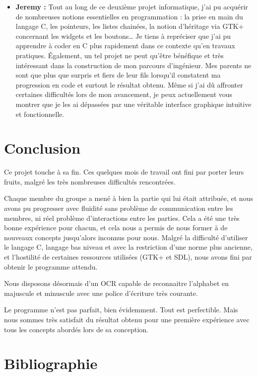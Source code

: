 \documentclass[12pt]{report}
\begin{document}
\begin{itemize}
	\item \textbf{Jeremy :} Tout au long de ce deuxième projet informatique, j’ai pu acquérir de nombreuses notions essentielles en programmation : la prise en main du langage C, les pointeurs, les listes chainées, la notion d’héritage via GTK+ concernant les widgets et les boutons… Je tiens à repréciser que j’ai pu apprendre à coder en C plus rapidement dans ce contexte qu’en travaux pratiques. Également, un tel projet ne peut qu’être bénéfique et très intéressant dans la construction de mon parcours d’ingénieur. Mes parents ne sont que plus que surpris et fiers de leur fils lorsqu’il constatent ma progression en code et surtout le résultat obtenu. Même si j’ai dû affronter certaines difficultés lors de mon avancement, je peux actuellement vous montrer que je les ai dépassées par une véritable interface graphique intuitive et fonctionnelle.
\end{itemize}

\chapter{Conclusion}

Ce projet touche à sa fin. Ces quelques mois de travail ont fini par porter leurs fruits, malgré les très nombreuses difficultés rencontrées.

Chaque membre du groupe a mené à bien la partie qui lui était attribuée, et nous avons pu progresser avec fluidité sans problème de communication entre les membres, ni réel problème d'interactions entre les parties. Cela a été une très bonne expérience pour chacun, et cela nous a permis de nous former à de nouveaux concepts jusqu'alors inconnus pour nous. Malgré la difficulté d'utiliser le langage C, langage bas niveau et avec la restriction d'une norme plus ancienne, et l'hostilité de certaines ressources utilisées (GTK+ et SDL), nous avons fini par obtenir le programme attendu.

Nous disposons désormais d'un OCR capable de reconnaitre l'alphabet en majuscule et minuscule avec une police d'écriture très courante. 

Le programme n'est pas parfait, bien évidemment. Tout est perfectible. Mais nous sommes très satisfait du résultat obtenu pour une première expérience avec tous les concepts abordés lors de sa conception.

\chapter{Bibliographie}
\end{document}
